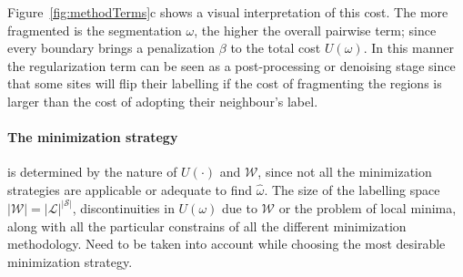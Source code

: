 Figure~\ref{fig:methodTerms}c shows a visual interpretation of this cost.
The more fragmented is the segmentation $\omega$, the higher the overall pairwise term; since every boundary brings a penalization $\beta$ to the total cost $U(\omega)$.
In this manner the regularization term can be seen as a post-processing or denoising stage since that some sites will flip their labelling if the cost of fragmenting the regions is larger than the cost of adopting their neighbour's label. 


\paragraph{The minimization strategy} \label{sec:method:min}
is determined by the nature of $U(\cdot)$ and $\mathcal{W}$, since not all the minimization strategies are applicable or adequate to find $\hat{\omega}$.
The size of the labelling space $|\mathcal{W}|=|\mathcal{L}|^{|\mathcal{S}|}$, discontinuities in $U(\omega)$ due to $\mathcal{W}$ or the problem of local minima, 
along with all the particular constrains of all the different minimization methodology.
Need to be taken into account while choosing the most desirable minimization strategy.

